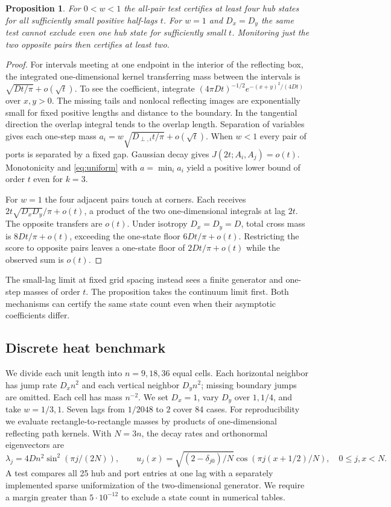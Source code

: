 \documentclass[11pt]{article}
\newtheorem{proposition}[theorem]{Proposition}
\begin{document}
\begin{proposition}\label{prop:geometry}
For \(0<w<1\) the all-pair test certifies at least four hub states for all sufficiently small positive half-lags \(t\). For \(w=1\) and \(D_x=D_y\) the same test cannot exclude even one hub state for sufficiently small \(t\). Monitoring just the two opposite pairs then certifies at least two.
\end{proposition}
\begin{proof}
For intervals meeting at one endpoint in the interior of the reflecting box, the integrated one-dimensional kernel transferring mass between the intervals is
\(\sqrt{Dt/\pi}+o(\sqrt t)\). To see the coefficient, integrate
\((4\pi Dt)^{-1/2}e^{-(x+y)^2/(4Dt)}\) over \(x,y>0\). The missing tails and nonlocal reflecting images are exponentially small for fixed positive lengths and distance to the boundary. In the tangential direction the overlap integral tends to the overlap length. Separation of variables gives each one-step mass
\(a_i=w\sqrt{D_{\perp,i}t/\pi}+o(\sqrt t)\). When \(w<1\) every pair of ports is separated by a fixed gap. Gaussian decay gives \(J(2t;A_i,A_j)=o(t)\). Monotonicity and \eqref{eq:uniform} with \(a=\min_i a_i\) yield a positive lower bound of order \(t\) even for \(k=3\).

For \(w=1\) the four adjacent pairs touch at corners. Each receives
\(2t\sqrt{D_xD_y}/\pi+o(t)\), a product of the two one-dimensional integrals at lag \(2t\). The opposite transfers are \(o(t)\). Under isotropy \(D_x=D_y=D\), total cross mass is \(8Dt/\pi+o(t)\), exceeding the one-state floor \(6Dt/\pi+o(t)\). Restricting the score to opposite pairs leaves a one-state floor of \(2Dt/\pi+o(t)\) while the observed sum is \(o(t)\).
\end{proof}

The small-lag limit at fixed grid spacing instead sees a finite generator and one-step masses of order \(t\). The proposition takes the continuum limit first. Both mechanisms can certify the same state count even when their asymptotic coefficients differ.

\subsection{Discrete heat benchmark}
We divide each unit length into \(n=9,18,36\) equal cells. Each horizontal neighbor has jump rate \(D_xn^2\) and each vertical neighbor \(D_yn^2\); missing boundary jumps are omitted. Each cell has mass \(n^{-2}\). We set \(D_x=1\), vary \(D_y\) over \(1,1/4\), and take \(w=1/3,1\). Seven lags from \(1/2048\) to \(2\) cover 84 cases. For reproducibility we evaluate rectangle-to-rectangle masses by products of one-dimensional reflecting path kernels. With \(N=3n\), the decay rates and orthonormal eigenvectors are
\[
 \lambda_j=4Dn^2\sin^2(\pi j/(2N)),\qquad
 u_j(x)=\sqrt{(2-\delta_{j0})/N}\cos(\pi j(x+1/2)/N),
 \quad 0\le j,x<N .
\]
A test compares all 25 hub and port entries at one lag with a separately implemented sparse uniformization of the two-dimensional generator. We require a margin greater than \(5\cdot10^{-12}\) to exclude a state count in numerical tables.
\end{document}

